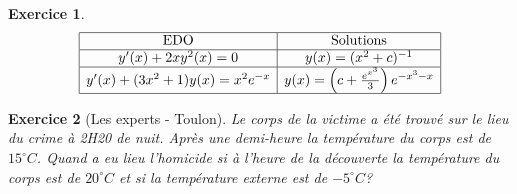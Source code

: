 \documentclass[a4paper,10pt]{scrartcl}
\theoremstyle{definition}
\theoremstyle{remark}
\theoremstyle{plain}
\newtheorem{exo}{Exercice}[section]
\newcommand{\celsius}{^\circ C}
\begin{document}
\begin{exo}
\[
\begin{array}{|c|c|}
\hline
\text{EDO} 						& \text{Solutions}									\\
\hline
y'(x)+2xy^2(x)=0				&	y(x)=(x^2+c)^{-1}								\\
\hline
y'(x)+(3x^2+1)y(x)=x^2e^{-x}	&	y(x)=\left(c+\frac{e^{x^3}}{3}\right)e^{-x^3-x}	\\
\hline
\end{array}
\]
\end{exo}

\begin{exo}[\flqq Les experts - Toulon\frqq]\label{exo.experts}
Le corps de la victime a été trouvé sur le lieu du crime à 2H20 de nuit. Après une demi-heure la température du corps est de $15\celsius$. Quand a eu lieu l'homicide si à l'heure de la découverte la température du corps est de $20\celsius$ et si la température externe est de $-5\celsius$?  
\end{exo}
\end{document}
